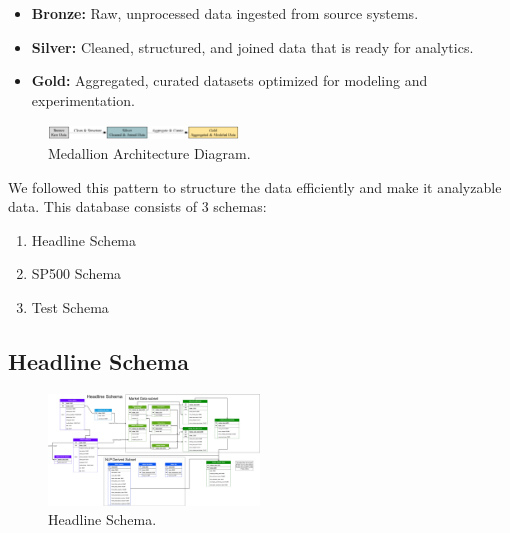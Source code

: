 \documentclass[twocolumn]{article}
\begin{document}
\begin{itemize}
    \item \textbf{Bronze:} Raw, unprocessed data ingested from source systems.
    \item \textbf{Silver:} Cleaned, structured, and joined data that is ready for analytics.
    \item \textbf{Gold:} Aggregated, curated datasets optimized for modeling and experimentation.
\end{itemize}
\begin{figure}[h!]
    \centering
    \includegraphics[width=0.45\textwidth]{medallion_architecture.png}
    \caption{Medallion Architecture Diagram.}
    \label{fig:modeling-evolution}
\end{figure}

We followed this pattern to structure the data efficiently and make it analyzable data. This database consists of 3 schemas:
\begin{enumerate}
    \item Headline Schema
    \item SP500 Schema
    \item Test Schema
\end{enumerate}


\subsection{Headline Schema}
\begin{figure}[h!]
    \centering
    \includegraphics[width=0.5\textwidth]{headlines_schema.png}
    \caption{Headline Schema.}
    \label{fig:headline-schema}
\end{figure}
\end{document}
